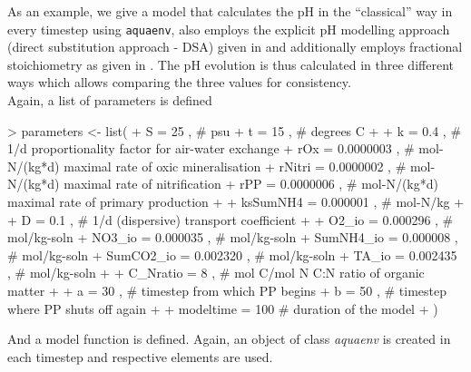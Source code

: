 \documentclass[article,nojss]{jss}
\begin{document}
\noindent
As an example, we give a model that calculates the pH in the ``classical'' way in every timestep using \texttt{aquaenv}, also employs the explicit pH modelling 
approach (direct substitution approach - DSA) given in \cite{Hofmann2008} and additionally employs fractional stoichiometry as given in \cite{Hofmann2008c}.
The pH evolution is thus calculated in three different ways which allows comparing the three values for consistency.\\

\noindent
Again, a list of parameters is defined
\begin{scriptsize}
\begin{Schunk}
\begin{Sinput}
> parameters <- list(             
+      S          = 25    , # psu       
+      t          = 15    , # degrees C
+                    
+      k          = 0.4       , # 1/d	    proportionality factor for air-water exchange
+      rOx        = 0.0000003 , # mol-N/(kg*d)  maximal rate of oxic mineralisation
+      rNitri     = 0.0000002 , # mol-N/(kg*d)  maximal rate of nitrification 
+      rPP        = 0.0000006 , # mol-N/(kg*d)  maximal rate of primary production
+                    
+      ksSumNH4   = 0.000001  , # mol-N/kg
+                   
+      D          = 0.1       , #   1/d            (dispersive) transport coefficient
+                    
+      O2_io      = 0.000296  , # mol/kg-soln 
+      NO3_io     = 0.000035  , # mol/kg-soln 
+      SumNH4_io  = 0.000008  , # mol/kg-soln 
+      SumCO2_io  = 0.002320  , # mol/kg-soln 
+      TA_io      = 0.002435  , # mol/kg-soln 
+                    
+      C_Nratio   = 8       , # mol C/mol N     C:N ratio of organic matter
+                   
+      a          = 30       , # timestep from which PP begins     
+      b          = 50       , # timestep where PP shuts off again
+                    
+      modeltime  = 100        # duration of the model
+                    )
\end{Sinput}
\end{Schunk}
\end{scriptsize}

And a model function is defined. Again, an object of class \textit{aquaenv} is created in each timestep and respective elements are used.
\end{document}
